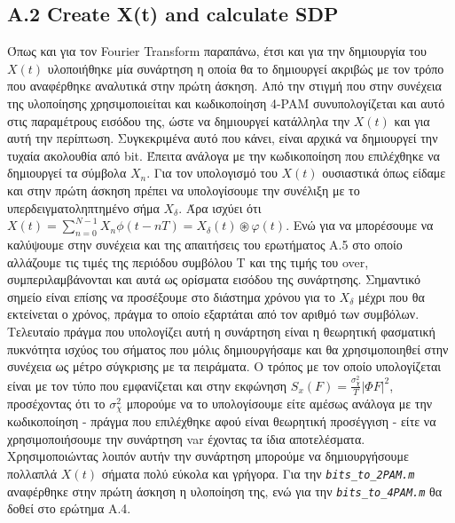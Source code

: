 \documentclass[11pt]{article}
\begin{document}
    \subsection*{A.2 Create X(t) and calculate SDP}
    Όπως και για τον Fourier Transform παραπάνω, έτσι και για την δημιουργία του $X(t)$ υλοποιήθηκε μία συνάρτηση η οποία θα το δημιουργεί ακριβώς με τον τρόπο που αναφέρθηκε αναλυτικά στην πρώτη άσκηση. Από την στιγμή που στην συνέχεια της υλοποίησης χρησιμοποιείται και κωδικοποίηση 4-PAM συνυπολογίζεται και αυτό στις παραμέτρους εισόδου της, ώστε να δημιουργεί κατάλληλα την $X(t)$ και για αυτή την περίπτωση. 
    Συγκεκριμένα αυτό που κάνει, είναι αρχικά να δημιουργεί την τυχαία ακολουθία από bit. 
    Έπειτα ανάλογα με την κωδικοποίηση που επιλέχθηκε να δημιουργεί τα σύμβολα $X_n$. Για τον υπολογισμό του $X(t)$ ουσιαστικά όπως είδαμε και στην πρώτη άσκηση πρέπει να υπολογίσουμε την συνέλιξη με το υπερδειγματοληπτημένο σήμα $X_{\delta}$.
    Άρα ισχύει ότι $X(t) = \sum_{n=0}^{N-1}X_n\phi(t-nT) = X_δ (t) \circledast  φ(t)$. 
    Ενώ για να μπορέσουμε να καλύψουμε στην συνέχεια και της απαιτήσεις του ερωτήματος Α.5 στο οποίο αλλάζουμε τις τιμές της περιόδου συμβόλου T και της τιμής του over, συμπεριλαμβάνονται και αυτά ως ορίσματα εισόδου της συνάρτησης.
    Σημαντικό σημείο είναι επίσης να προσέξουμε στο διάστημα χρόνου για το $X_{\delta}$ μέχρι που θα εκτείνεται ο χρόνος, πράγμα το οποίο εξαρτάται από τον αριθμό των συμβόλων. 
    Τελευταίο πράγμα που υπολογίζει αυτή η συνάρτηση είναι η θεωρητική φασματική πυκνότητα ισχύος του σήματος που μόλις δημιουργήσαμε και θα χρησιμοποιηθεί στην συνέχεια ως μέτρο σύγκρισης με τα πειράματα. 
    Ο τρόπος με τον οποίο υπολογίζεται είναι με τον τύπο που εμφανίζεται και στην εκφώνηση $S_x(F)=\frac{σ_χ^2}{T}|\Phi{F}|^2$, προσέχοντας ότι το $σ_χ^2$ μπορούμε να το υπολογίσουμε είτε αμέσως ανάλογα με την κωδικοποίηση - πράγμα που επιλέχθηκε αφού είναι θεωρητική προσέγγιση - είτε να χρησιμοποιήσουμε την συνάρτηση var έχοντας τα ίδια αποτελέσματα.
    Χρησιμοποιώντας λοιπόν αυτήν την συνάρτηση μπορούμε να δημιουργήσουμε πολλαπλά $X(t)$ σήματα πολύ εύκολα και γρήγορα.
    Για την \emph{\texttt{bits\_to\_2PAM.m}} αναφέρθηκε στην πρώτη άσκηση η υλοποίηση της, ενώ για την \emph{\texttt{bits\_to\_4PAM.m}} θα δοθεί στο ερώτημα Α.4.
    
\end{document}
